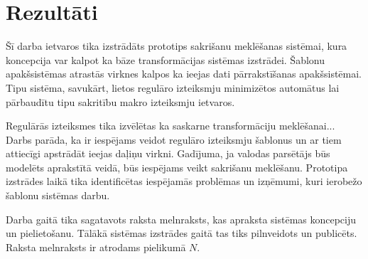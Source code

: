 \section{\label{s:results}Rezultāti}

Šī darba ietvaros tika izstrādāts prototips sakrišanu meklēšanas sistēmai, kura koncepcija var kalpot ka bāze transformācijas sistēmas izstrādei. Šablonu apakšsistēmas atrastās virknes kalpos ka ieejas dati pārrakstīšanas apakšsistēmai. Tipu sistēma, savukārt, lietos regulāro izteiksmju minimizētos automātus lai pārbaudītu tipu sakritību makro izteiksmju ietvaros.

Regulārās izteiksmes tika izvēlētas ka saskarne transformāciju meklēšanai...
Darbs parāda, ka ir iespējams veidot regulāro izteiksmju šablonus un ar tiem attiecīgi apstrādāt ieejas daļiņu virkni. Gadījuma, ja valodas parsētājs būs modelēts aprakstītā veidā, būs iespējams veikt sakrišanu meklēšanu.
Prototipa izstrādes laikā tika identificētas iespējamās problēmas un izņēmumi, kuri ierobežo šablonu sistēmas darbu.

Darba gaitā tika sagatavots raksta melnraksts, kas apraksta sistēmas koncepciju un pielietošanu. Tālākā sistēmas izstrādes gaitā tas tiks pilnveidots un publicēts. Raksta melnraksts ir atrodams pielikumā $N$.